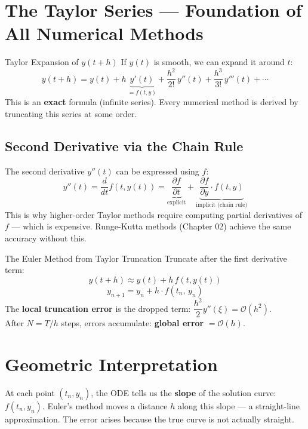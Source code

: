 \documentclass[12pt, a4paper]{article}
\begin{document}
\section{The Taylor Series — Foundation of All Numerical Methods}

\begin{theorybox}{Taylor Expansion of $y(t+h)$}
If $y(t)$ is smooth, we can expand it around $t$:
\[
  y(t+h) = y(t) + h\,\underbrace{y'(t)}_{= f(t,y)} + \frac{h^2}{2!}\,y''(t) + \frac{h^3}{3!}\,y'''(t) + \cdots
\]
This is an \textbf{exact} formula (infinite series). Every numerical method is derived by truncating this series at some order.
\end{theorybox}

\subsection*{Second Derivative via the Chain Rule}

The second derivative $y''(t)$ can be expressed using $f$:
\[
  y''(t) = \frac{d}{dt}f(t,y(t)) = \underbrace{\frac{\partial f}{\partial t}}_{\text{explicit}} + \underbrace{\frac{\partial f}{\partial y}\cdot f(t,y)}_{\text{implicit (chain rule)}}
\]
This is why higher-order Taylor methods require computing partial derivatives of $f$ — which is expensive. Runge-Kutta methods (Chapter 02) achieve the same accuracy without this.

\begin{theorybox}{The Euler Method from Taylor Truncation}
Truncate after the first derivative term:
\[
  y(t+h) \approx y(t) + h\,f(t,y(t))
\]
\[
  \boxed{y_{n+1} = y_n + h\cdot f(t_n,\,y_n)}
\]
The \textbf{local truncation error} is the dropped term: $\dfrac{h^2}{2}y''(\xi) = \mathcal{O}(h^2)$.\\
After $N = T/h$ steps, errors accumulate: \textbf{global error} $= \mathcal{O}(h)$.
\end{theorybox}

\section{Geometric Interpretation}

At each point $(t_n, y_n)$, the ODE tells us the \textbf{slope} of the solution curve: $f(t_n, y_n)$.
Euler's method moves a distance $h$ along this slope — a straight-line approximation.
The error arises because the true curve is not actually straight.
\end{document}
